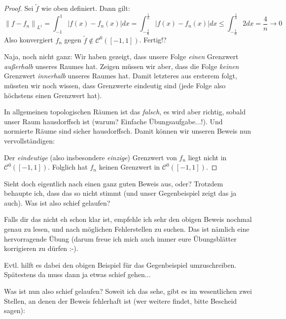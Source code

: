 \documentclass[a4paper,ngerman,12pt,bibtotoc]{scrartcl}
\theoremstyle{definition}
\theoremstyle{plain}
\theoremstyle{remark}
\newcommand{\lInorm}[1]{\left\lVert #1 \right\rVert_{L^1}}
\begin{document}
	\begin{proof}
	Sei $\tilde{f}$ wie oben definiert. Dann gilt:
		\[\lInorm{f-f_n} = \int_{-1}^1\left|f(x)-f_n(x)\right|dx = \int_{-\frac{1}{n}}^{\frac{1}{n}}\left|f(x)-f_n(x)\right|dx \leq \int_{-\frac{1}{n}}^{\frac{1}{n}}2dx=\frac{4}{n}\to 0\]
	Also konvergiert $f_n$ gegen $\tilde{f} \notin \mathcal{C}^0\left(\left[-1,1\right]\right)$. Fertig!?
	
	Naja, noch nicht ganz: Wir haben gezeigt, dass unsere Folge \emph{einen} Grenzwert \emph{außerhalb} unseres Raumes hat. Zeigen müssen wir aber, dass die Folge \emph{keinen} Grenzwert \emph{innerhalb} unseres Raumes hat. Damit letzteres aus ersterem folgt, müssten wir noch wissen, dass Grenzwerte eindeutig sind (jede Folge also höchstens einen Grenzwert hat).
	
	In allgemeinen topologischen Räumen ist das \emph{falsch}, es wird aber richtig, sobald unser Raum hausdorffsch ist (warum? Einfache Übungsaufgabe...!). Und normierte Räume sind sicher hausdorffsch. Damit können wir unseren \glqq Beweis\grqq{} nun vervollständigen:
	
	Der \emph{eindeutige} (also insbesondere \emph{einzige}) Grenzwert von $f_n$ liegt nicht in $\mathcal{C}^0\left(\left[-1,1\right]\right)$. Folglich hat $f_n$ keinen Grenzwert in $\mathcal{C}^0\left(\left[-1,1\right]\right)$.
	\end{proof}
	
	Sieht doch eigentlich nach einen ganz guten Beweis aus, oder? Trotzdem behaupte ich, dass das so nicht stimmt (und unser Gegenbeispiel zeigt das ja auch). Was ist also schief gelaufen?
	
	Falls dir das nicht eh schon klar ist, empfehle ich sehr den obigen Beweis nochmal genau zu lesen, und nach möglichen Fehlerstellen zu suchen. Das ist nämlich eine hervorragende Übung (darum freue ich mich auch immer eure Übungsblätter korrigieren zu dürfen :-).
	
	Evtl. hilft es dabei den obigen Beispiel für das Gegenbeispiel umzuschreiben. Spätestens da muss dann ja etwas schief gehen...
	
	\newpage
	
	Was ist nun also schief gelaufen? Soweit ich das sehe, gibt es im wesentlichen zwei Stellen, an denen der \glqq Beweis\grqq{} fehlerhaft ist (wer weitere findet, bitte Bescheid sagen):
	
\end{document}
